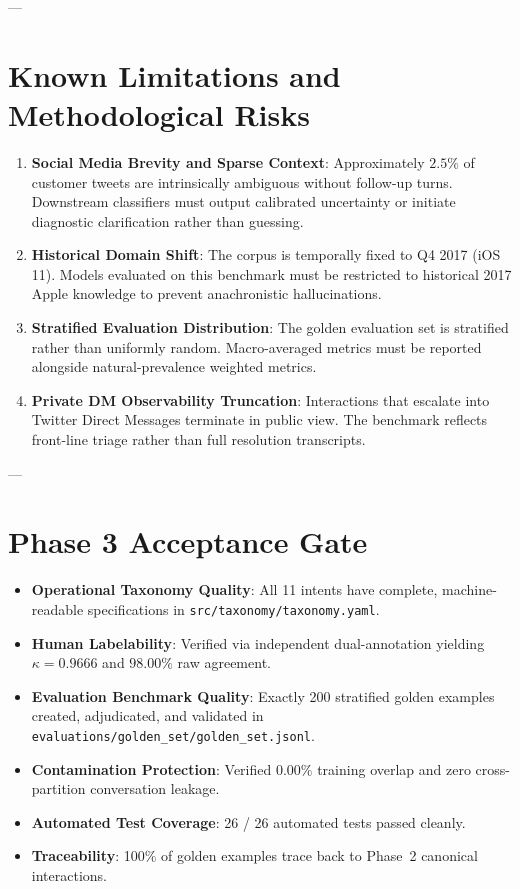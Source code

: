 \documentclass[11pt,a4paper]{article}
\begin{document}
---

\section{Known Limitations and Methodological Risks}

\begin{enumerate}[leftmargin=*]
    \item \textbf{Social Media Brevity and Sparse Context}: Approximately $2.5\%$ of customer tweets are intrinsically ambiguous without follow-up turns. Downstream classifiers must output calibrated uncertainty or initiate diagnostic clarification rather than guessing.
    \item \textbf{Historical Domain Shift}: The corpus is temporally fixed to Q4 2017 (iOS 11). Models evaluated on this benchmark must be restricted to historical 2017 Apple knowledge to prevent anachronistic hallucinations.
    \item \textbf{Stratified Evaluation Distribution}: The golden evaluation set is stratified rather than uniformly random. Macro-averaged metrics must be reported alongside natural-prevalence weighted metrics.
    \item \textbf{Private DM Observability Truncation}: Interactions that escalate into Twitter Direct Messages terminate in public view. The benchmark reflects front-line triage rather than full resolution transcripts.
\end{enumerate}

---

\section{Phase 3 Acceptance Gate}

\begin{tcolorbox}[colback=green!5,colframe=green!50!black,title=\textbf{Phase 3 Acceptance Gate Evaluation: PASS --- FROZEN}]
\begin{itemize}[leftmargin=*]
    \item \textbf{Operational Taxonomy Quality}: All 11 intents have complete, machine-readable specifications in \texttt{src/taxonomy/taxonomy.yaml}.
    \item \textbf{Human Labelability}: Verified via independent dual-annotation yielding $\kappa = 0.9666$ and $98.00\%$ raw agreement.
    \item \textbf{Evaluation Benchmark Quality}: Exactly 200 stratified golden examples created, adjudicated, and validated in \texttt{evaluations/golden\_set/golden\_set.jsonl}.
    \item \textbf{Contamination Protection}: Verified $0.00\%$ training overlap and zero cross-partition conversation leakage.
    \item \textbf{Automated Test Coverage}: 26 / 26 automated tests passed cleanly.
    \item \textbf{Traceability}: 100\% of golden examples trace back to Phase~2 canonical interactions.
\end{itemize}
\end{tcolorbox}
\end{document}
